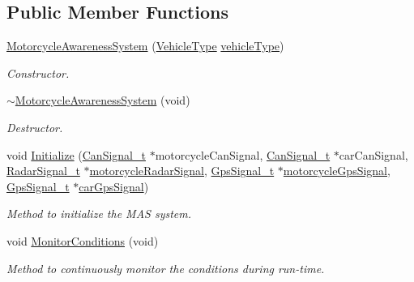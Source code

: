 \subsection*{Public Member Functions}
\begin{DoxyCompactItemize}
\item 
\hyperlink{classMotorcycleAwarenessSystem_ab0fb3823809dc056fecc82cc72a80a55}{Motorcycle\-Awareness\-System} (\hyperlink{MotorcycleAwarenessSystemTypes_8hpp_a0c05c42b98a847f971385c81c2a81afa}{Vehicle\-Type} \hyperlink{classMotorcycleAwarenessSystem_a977b2085bfbf6a62902bf2d80160e6d2}{vehicle\-Type})
\begin{DoxyCompactList}\small\item\em Constructor. \end{DoxyCompactList}\item 
\hyperlink{classMotorcycleAwarenessSystem_a89ce16a722b3575e1415cbe9c7eedbd3}{$\sim$\-Motorcycle\-Awareness\-System} (void)
\begin{DoxyCompactList}\small\item\em Destructor. \end{DoxyCompactList}\item 
void \hyperlink{classMotorcycleAwarenessSystem_a55f1ea16b6311120ea42b460fb8b3a71}{Initialize} (\hyperlink{structCanSignal__t}{Can\-Signal\-\_\-t} $\ast$motorcycle\-Can\-Signal, \hyperlink{structCanSignal__t}{Can\-Signal\-\_\-t} $\ast$car\-Can\-Signal, \hyperlink{structRadarSignal__t}{Radar\-Signal\-\_\-t} $\ast$\hyperlink{classMotorcycleAwarenessSystem_a0744e71b9f440a86f5078c876ba7629b}{motorcycle\-Radar\-Signal}, \hyperlink{structGpsSignal__t}{Gps\-Signal\-\_\-t} $\ast$\hyperlink{classMotorcycleAwarenessSystem_ab281a3993b574923b2f379ed0477b2d4}{motorcycle\-Gps\-Signal}, \hyperlink{structGpsSignal__t}{Gps\-Signal\-\_\-t} $\ast$\hyperlink{classMotorcycleAwarenessSystem_a9a8185e00b60d0be58bfa76166063128}{car\-Gps\-Signal})
\begin{DoxyCompactList}\small\item\em Method to initialize the M\-A\-S system. \end{DoxyCompactList}\item 
void \hyperlink{classMotorcycleAwarenessSystem_afb19e832c17d43941d9ed6c4f4435a2e}{Monitor\-Conditions} (void)
\begin{DoxyCompactList}\small\item\em Method to continuously monitor the conditions during run-\/time. \end{DoxyCompactList}\end{DoxyCompactItemize}
